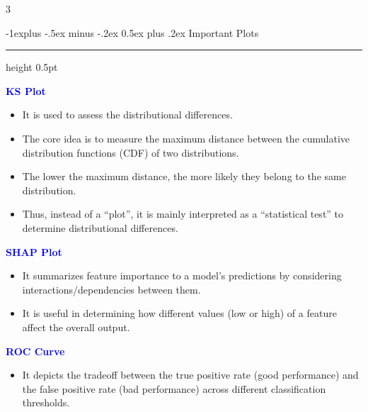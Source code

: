 \documentclass[letterpaper, 10.5pt,landscape]{article}
\makeatletter
\renewcommand{\subsection}{\@startsection{subsection}{2}{0mm}%
                                {-1explus -.5ex minus -.2ex}%
                                {0.5ex plus .2ex}%
                                {\normalfont\normalsize\bfseries}}
\makeatother
\begin{document}
\begin{multicols*}{3}
\begin{enumerate}[leftmargin=4mm]
\end{enumerate}







\subsection{Important Plots} {\color{teal}\hrule height 0.5pt} \smallskip

\textbf{\textcolor{blue}{KS Plot}}
\vspace{-2pt}
\begin{itemize}[leftmargin=4mm]
    \vspace{-2pt}
    \item It is used to assess the distributional differences.
    \vspace{-2pt}
    \item The core idea is to measure the maximum distance between the cumulative distribution functions (CDF) of two distributions.
    \vspace{-2pt}
    \item The lower the maximum distance, the more likely they belong to the same distribution.
    \vspace{-2pt}
    \item Thus, instead of a “plot”, it is mainly interpreted as a “statistical test” to determine distributional differences.
\end{itemize}







\textbf{\textcolor{blue}{SHAP Plot}}
\vspace{-2pt}
\begin{itemize}[leftmargin=4mm]
    \item It summarizes feature importance to a model’s predictions by considering interactions/dependencies between them.
    \vspace{-2pt}
    \item It is useful in determining how different values (low or high) of a feature affect the overall output.
\end{itemize}




\textbf{\textcolor{blue}{ROC Curve}}
\vspace{-2pt}
\begin{itemize}[leftmargin=4mm]
    \item It depicts the tradeoff between the true positive rate (good performance) and the false positive rate (bad performance) across different classification thresholds.
\end{itemize}



\end{multicols*}
\end{document}
